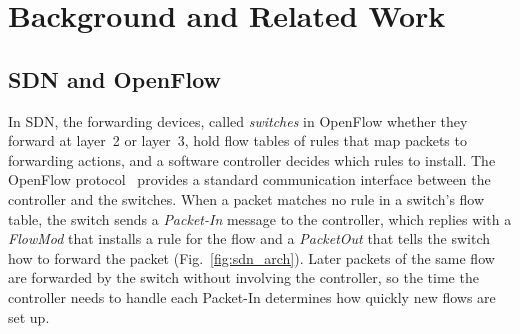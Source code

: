 \documentclass[conference]{IEEEtran}
\begin{document}
\section{Background and Related Work}
\label{sec:related}

\subsection{SDN and OpenFlow}
\label{sec:background}

In SDN, the forwarding devices, called \emph{switches} in OpenFlow
whether they forward at layer~2 or layer~3, hold flow tables of
rules that map packets to forwarding actions, and a software
controller decides which rules to install. The OpenFlow
protocol~\cite{McKeown2008OpenFlow,OpenFlow13Spec} provides a
standard communication interface between the controller and the
switches. When a packet matches no rule in a switch's flow table,
the switch sends a \emph{Packet-In} message to the controller,
which replies with a \emph{FlowMod} that installs a rule for the
flow and a \emph{PacketOut} that tells the switch how to forward
the packet (Fig.~\ref{fig:sdn_arch}). Later packets of the same
flow are forwarded by the switch without involving the controller,
so the time the controller needs to handle each Packet-In
determines how quickly new flows are set up.
\end{document}
